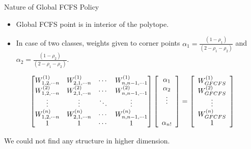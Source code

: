 \documentclass[compress, serif, onlymath, professionalfonts]{beamer}
\begin{document}
\begin{frame}{Nature of Global FCFS Policy}
\begin{itemize}
\item Global FCFS point is in interior of the polytope.
\item In case of two classes, weights given to corner points  $\alpha_1 = \frac{(1-\rho_1)}{(2-\rho_1 -\rho_2)}$ and $\alpha_2 = \frac{(1-\rho_2)}{(2-\rho_1 -\rho_2)}$.
\end{itemize}
\begin{equation}\nonumber
 \begin{bmatrix} W^{(1)}_{1,2,\cdots n} & W^{(1)}_{2,1,\cdots n} & \cdots & W^{(1)}_{n,n-1,\cdots 1}\\ W^{(2)}_{1,2,\cdots n} & W^{(2)}_{2,1,\cdots n} & \cdots & W^{(2)}_{n,n-1,\cdots 1}\\
 \vdots & \vdots & \ddots & \vdots \\
 W^{(n)}_{1,2,\cdots n} & W^{(n)}_{2,1,\cdots n} & \cdots & W^{(n)}_{n,n-1,\cdots 1}\\
 1 & 1 & \cdots & 1
  \end{bmatrix}  \left[ \begin{array}{c} \alpha_1 \\ \alpha_2 \\  \vdots \\ \vspace{0.2cm} \\ \alpha_{n!} \end{array} \right] =   \left[ \begin{array}{cc} W^{(1)}_{GFCFS} \\ W^{(2)}_{GFCFS} \\ \vdots \\ W^{(n)}_{GFCFS} \\ 1 \end{array} \right]
\end{equation}
\begin{block}{}
We could not find any structure in higher dimension.
\end{block}
\end{frame}
\end{document}
